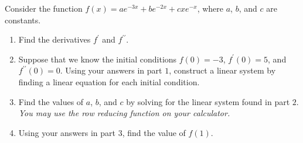 \begin{question}
  \label{qst:dealing_with_derivatives}

  Consider the function $f(x) = ae^{-3x} + be^{-2x} + cxe^{-x}$, where $a$,
  $b$, and $c$ are constants.

  \begin{enumerate}
    \label{enum:dealing_with_derivatives_qst}

    \item Find the derivatives $f^{\prime}$ and $f^{\prime\prime}$.

    \item Suppose that we know the initial conditions $f(0) = -3$,
      $f^{\prime}(0) = 5$, and $f^{\prime\prime}(0) = 0$. Using your answers in
      part $1$, construct a linear system by finding a linear equation for each
      initial condition.

    \item Find the values of $a$, $b$, and $c$ by solving for the linear system
      found in part $2$. \textit{You may use the row reducing function on your
      calculator.}

    \item Using your answers in part $3$, find the value of $f(1)$.
  \end{enumerate}
\end{question}

